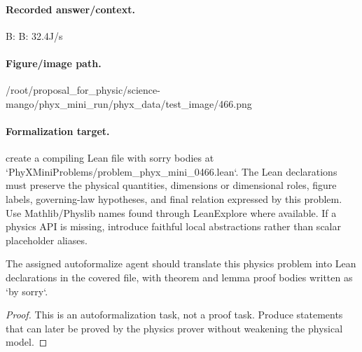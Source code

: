 \paragraph{Recorded answer/context.}
B: B: 32.4J/s

\paragraph{Figure/image path.}
/root/proposal\_for\_physic/science-mango/phyx\_mini\_run/phyx\_data/test\_image/466.png

\paragraph{Formalization target.}
create a compiling Lean file with sorry bodies at `PhyXMiniProblems/problem\_phyx\_mini\_0466.lean`. The Lean declarations must preserve the physical quantities, dimensions or dimensional roles, figure labels, governing-law hypotheses, and final relation expressed by this problem.
Use Mathlib/Physlib names found through LeanExplore where available. If a physics API is missing, introduce faithful local abstractions rather than scalar placeholder aliases.

\begin{theorem}
\label{thm:physics:phyx_mini_0466:target}
The assigned autoformalize agent should translate this physics problem into Lean declarations in the covered file, with theorem and lemma proof bodies written as `by sorry`.
\end{theorem}
\begin{proof}
This is an autoformalization task, not a proof task. Produce statements that can later be proved by the physics prover without weakening the physical model.
\end{proof}


